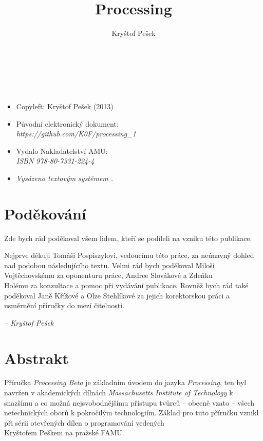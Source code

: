 \documentclass[10pt,twoside=true,open=right,cleardoublepage=empty,chapterprefix=true]{scrbook}
\title{Processing}
\author{Kryštof Pešek}
\date{} %
\newcommand{\oddilN}[1]{\section*{#1}\index{#1}\label{#1}}
\begin{document}

\makeglossary
\makeglossaries


\newpage
\ 

\pagestyle{empty}


\newpage
\ 


\vfill

\begin{itemize}
\item[] Copyleft: Kryštof Pešek (2013)
\item[]
Původní elektronický dokument: \\
{\em https://github.com/K0F/processing\_1}
\item[]
Vydalo Nakladatelství AMU: \\
{\em ISBN 978-80-7331-224-4}
\item[]
{\em Vysázeno textovým systémem \XeLaTeX.}



\end{itemize}

\newpage


\oddilN{Poděkování}
Zde bych rád poděkoval všem lidem, kteří se podíleli na vzniku této publikace.

Nejprve děkuji Tomáši Pospiszylovi, vedoucímu této práce, za neúnavný dohled nad podobou následujícího textu.  Velmi rád bych poděkoval Miloši Vojtěchovskému za oponenturu práce, Andree Slovákové a Zdeňku \\Holému za konzultace a pomoc při vydávání publikace. Rovněž bych rád také poděkoval Janě Křížové a Olze Stehlíkové za jejich korektorskou práci a usměrnění příručky do mezí čitelnosti.


\vspace{5em}

\begin{flushright}
{\em \footnotesize{-- Kryštof Pešek}}
\end{flushright}

\vfill

\newpage

\oddilN{Abstrakt}

Příručka {\em Processing Beta} je základním úvodem do jazyka {\em Processing}, ten byl navržen v akademických dílnách {\em Massachusetts Institute of Technology} k snazšímu a co možná nejsvobodnějšímu přístupu tvůrců -- obecně vzato -- všech netechnických oborů k pokročilým technologiím. Základ pro tuto příručku vznikl při sérii otevřených dílen o programování vedených \\Kryštofem Peškem na pražské FAMU.
\end{document}
